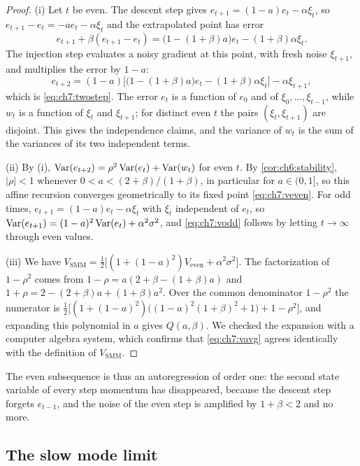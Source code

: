\begin{proof}
(i) Let $t$ be even. The descent step gives
$e_{t+1}=(1-a)e_t-\alpha\xi_t$, so $e_{t+1}-e_t=-ae_t-\alpha\xi_t$ and the
extrapolated point has error
\[
  e_{t+1}+\beta(e_{t+1}-e_t)
  =\bigl(1-(1+\beta)a\bigr)e_t-(1+\beta)\alpha\xi_t .
\]
The injection step evaluates a noisy gradient at this point, with fresh noise
$\xi_{t+1}$, and multiplies the error by $1-a$:
\[
  e_{t+2}=(1-a)\bigl[\bigl(1-(1+\beta)a\bigr)e_t-(1+\beta)\alpha\xi_t\bigr]-\alpha\xi_{t+1},
\]
which is \eqref{eq:ch7:twostep}. The error $e_t$ is a function of $e_0$ and of
$\xi_0,\dots,\xi_{t-1}$, while $w_t$ is a function of $\xi_t$ and $\xi_{t+1}$;
for distinct even $t$ the pairs $(\xi_t,\xi_{t+1})$ are disjoint. This gives the
independence claims, and the variance of $w_t$ is the sum of the variances of its
two independent terms.

(ii) By (i), $\operatorname{Var}(e_{t+2})=\rho^2\operatorname{Var}(e_t)+\operatorname{Var}(w_t)$ for even $t$. By
\cref{cor:ch6:stability}, $|\rho|<1$ whenever $0<a<(2+\beta)/(1+\beta)$, in
particular for $a\in(0,1]$, so this affine recursion converges geometrically to
its fixed point \eqref{eq:ch7:veven}. For odd times, $e_{t+1}=(1-a)e_t-\alpha\xi_t$
with $\xi_t$ independent of $e_t$, so $\operatorname{Var}(e_{t+1})=(1-a)^2\operatorname{Var}(e_t)+\alpha^2\sigma^2$,
and \eqref{eq:ch7:vodd} follows by letting $t\to\infty$ through even values.

(iii) We have $V_{\mathrm{SMM}}=\tfrac12\bigl[(1+(1-a)^2)V_{\mathrm{even}}+\alpha^2\sigma^2\bigr]$.
The factorization of $1-\rho^2$ comes from
$1-\rho=a(2+\beta-(1+\beta)a)$ and $1+\rho=2-(2+\beta)a+(1+\beta)a^2$. Over
the common denominator $1-\rho^2$ the numerator is
$\tfrac12\bigl[(1+(1-a)^2)\bigl((1-a)^2(1+\beta)^2+1\bigr)+1-\rho^2\bigr]$, and
expanding this polynomial in $a$ gives $Q(a,\beta)$. We checked the expansion
with a computer algebra system, which confirms that \eqref{eq:ch7:vavg} agrees
identically with the definition of $V_{\mathrm{SMM}}$.
\end{proof}

The even subsequence is thus an autoregression of order one: the second state
variable of every step momentum has disappeared, because the descent step
forgets $e_{t-1}$, and the noise of the even step is amplified by $1+\beta<2$
and no more.

\subsection{The slow mode limit}

